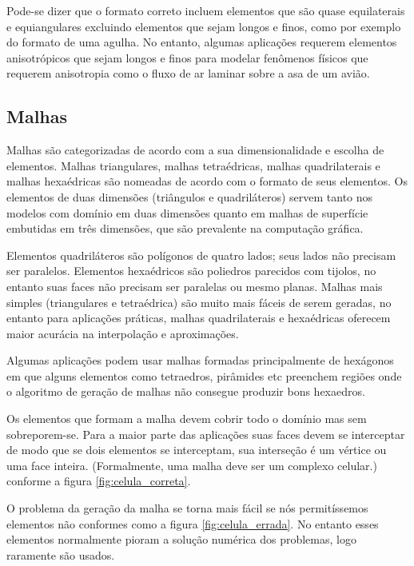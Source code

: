 Pode-se dizer que o formato correto incluem elementos que são quase equilaterais e equiangulares excluindo elementos que sejam longos e finos, como por exemplo do formato de uma agulha. No entanto, algumas aplicações requerem elementos anisotrópicos que sejam longos e finos para modelar fenômenos físicos que requerem anisotropia como o fluxo de ar laminar sobre a asa de um avião.

\subsection{Malhas}
Malhas são categorizadas de acordo com a sua dimensionalidade e escolha de elementos. Malhas triangulares, malhas tetraédricas, malhas quadrilaterais e malhas hexaédricas são nomeadas de acordo com o formato de seus elementos. Os elementos de duas dimensões (triângulos e quadriláteros) servem tanto nos modelos com domínio em duas dimensões quanto em malhas de superfície embutidas em três dimensões, que são prevalente na computação gráfica.

Elementos quadriláteros são polígonos de quatro lados; seus lados não precisam ser paralelos. Elementos hexaédricos são poliedros parecidos com tijolos, no entanto suas faces não precisam ser paralelas ou mesmo planas. Malhas mais simples (triangulares e tetraédrica) são muito mais fáceis de serem geradas, no entanto para aplicações práticas, malhas quadrilaterais e hexaédricas oferecem maior acurácia na interpolação e aproximações.

Algumas aplicações podem usar malhas formadas principalmente de hexágonos em que alguns elementos como tetraedros, pirâmides etc preenchem regiões onde o algoritmo de geração de malhas não consegue produzir bons hexaedros.

Os elementos que formam a malha devem cobrir todo o domínio mas sem sobreporem-se. Para a maior parte das aplicações suas faces devem se interceptar de modo que se dois elementos se interceptam, sua interseção é um vértice ou uma face inteira. (Formalmente, uma malha deve ser um complexo celular.) conforme a figura \ref{fig:celula_correta}.

O problema da geração da malha se torna mais fácil se nós permitíssemos elementos não conformes como a figura \ref{fig:celula_errada}. No entanto esses elementos normalmente pioram a solução numérica dos problemas, logo raramente são usados.

